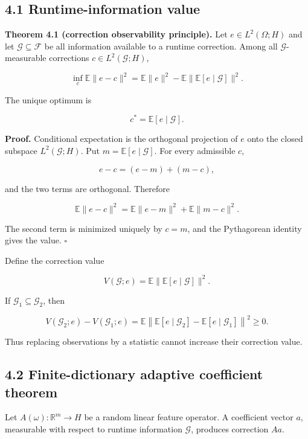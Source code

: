 \documentclass[
  10pt,
]{article}
\begin{document}
\subsection{4.1 Runtime-information
value}\label{runtime-information-value}

\textbf{Theorem 4.1 (correction observability principle).} Let
\(e\in L^2(\Omega;H)\) and let \(\mathcal G\subseteq\mathcal F\) be all
information available to a runtime correction. Among all
\(\mathcal G\)-measurable corrections \(c\in L^2(\mathcal G;H)\),

\[
\inf_c\mathbb E\|e-c\|^2
=
\mathbb E\|e\|^2-
\mathbb E\|\mathbb E[e\mid\mathcal G]\|^2.
\]

The unique optimum is

\[
c^*=\mathbb E[e\mid\mathcal G].
\]

\textbf{Proof.} Conditional expectation is the orthogonal projection of
\(e\) onto the closed subspace \(L^2(\mathcal G;H)\). Put
\(m=\mathbb E[e\mid\mathcal G]\). For every admissible \(c\),

\[
e-c=(e-m)+(m-c),
\]

and the two terms are orthogonal. Therefore

\[
\mathbb E\|e-c\|^2
=
\mathbb E\|e-m\|^2+
\mathbb E\|m-c\|^2.
\]

The second term is minimized uniquely by \(c=m\), and the Pythagorean
identity gives the value. \(\square\)

Define the correction value

\[
V(\mathcal G;e)
=
\mathbb E\|\mathbb E[e\mid\mathcal G]\|^2.
\]

If \(\mathcal G_1\subseteq\mathcal G_2\), then

\[
V(\mathcal G_2;e)-V(\mathcal G_1;e)
=
\mathbb E\left\|
\mathbb E[e\mid\mathcal G_2]
-
\mathbb E[e\mid\mathcal G_1]
\right\|^2
\ge0.
\]

Thus replacing observations by a statistic cannot increase their
correction value.

\subsection{4.2 Finite-dictionary adaptive coefficient
theorem}\label{finite-dictionary-adaptive-coefficient-theorem}

Let \(A(\omega):\mathbb R^m\to H\) be a random linear feature operator.
A coefficient vector \(a\), measurable with respect to runtime
information \(\mathcal G\), produces correction \(Aa\).
\end{document}

